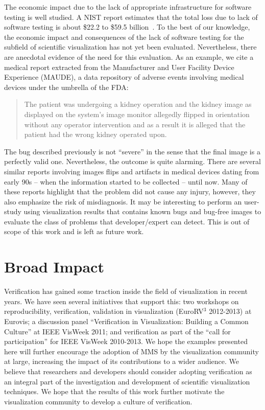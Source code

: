 The economic impact due to the lack of appropriate infrastructure for software testing is well studied.
%
A NIST report estimates that the total loss due to lack of software testing is about \$22.2 to \$59.5 billion~\cite{tassey2002economic}. 
%
To the best of our knowledge, the economic impact and consequences of the lack of software testing for the subfield of scientific visualization has not yet been evaluated. 
%
Nevertheless, there are anecdotal evidence of the need for this evaluation. As an example, we cite a medical report extracted from the Manufacturer and User Facility Device Experience (MAUDE), a data repository of adverse events involving medical devices under the umbrella of the FDA:
\begin{quote}
The patient was undergoing a kidney operation and the kidney image as displayed on the system's image monitor allegedly flipped in orientation without any operator intervention and as a result it is alleged that the patient had the wrong kidney operated upon.
\end{quote}
The bug described previously is not  ``severe'' in the sense that the final image is a perfectly valid one. Nevertheless, the outcome is quite alarming. There are several similar reports involving images flips and artifacts in medical devices dating from early 90s -- when the information started to be collected -- until now. Many of these reports highlight that the problem did not cause any injury, however, they also emphasize the risk of misdiagnosis.
%
It may be interesting to perform an user-study using visualization results that contains known bugs and bug-free images to evaluate the class of problems that developer/expert can detect.  This is out of scope of this work and is left as future work.


\section{Broad Impact}

Verification has gained some traction inside the field of visualization in recent years.  
%
We have seen several initiatives that support this: two workshops on reproducibility, verification, validation in visualization (EuroRV$^3$ 2012-2013) at Eurovis; a discussion panel ``Verification in Visualization: Building a Common Culture'' at IEEE VisWeek 2011; and verification as part of the ``call for participation'' for IEEE VisWeek 2010-2013.
%
We hope the  examples presented here will further encourage the adoption of MMS by the visualization community at large, increasing the impact of its contributions  to a wider audience.
%
We believe that researchers and developers should consider adopting verification as an integral part of the investigation and development of scientific visualization techniques.
%
We hope that the results of this work further motivate the visualization
community to develop a culture of verification.


